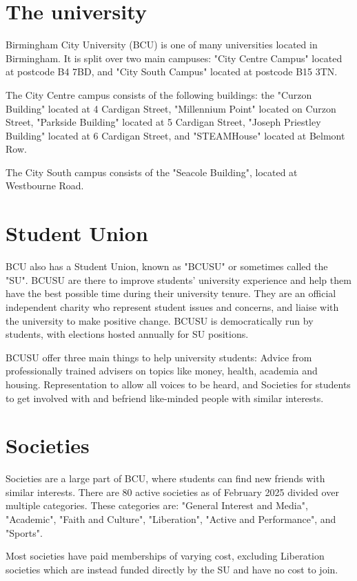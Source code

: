 \documentclass{article}
\begin{document}
\section{The university}
Birmingham City University (BCU) is one of many universities located in Birmingham. It is split over two main campuses:
"City Centre Campus" located at postcode B4 7BD, and "City South Campus" located at postcode B15 3TN.

The City Centre campus consists of the following buildings: the "Curzon Building" located at 4 Cardigan Street,
"Millennium Point" located on Curzon Street, "Parkside Building" located at 5 Cardigan Street, "Joseph Priestley Building"
located at 6 Cardigan Street, and "STEAMHouse" located at Belmont Row.

The City South campus consists of the "Seacole Building", located at \\ Westbourne Road.

\section{Student Union}
BCU also has a Student Union, known as "BCUSU" or sometimes called the "SU". BCUSU are there to improve students' university experience and help them 
have the best possible time during their university tenure. They are an official independent charity who represent student 
issues and concerns, and liaise with the university to make positive change. BCUSU is democratically run by students, with elections 
hosted annually for SU positions.

BCUSU offer three main things to help university students: Advice from professionally trained advisers on topics like money, health, academia 
and housing. Representation to allow all voices to be heard, and Societies for students to get involved with and befriend like-minded people 
with similar interests.


\section{Societies}
Societies are a large part of BCU, where students can find new friends with similar interests. There are 80 active societies as of 
February 2025 divided over multiple categories. These categories are: "General Interest and Media", "Academic", "Faith and Culture", "Liberation", 
"Active and Performance", and "Sports". 


Most societies have paid memberships of varying cost, excluding Liberation societies which are instead funded directly by the SU and have no 
cost to join.
\end{document}

